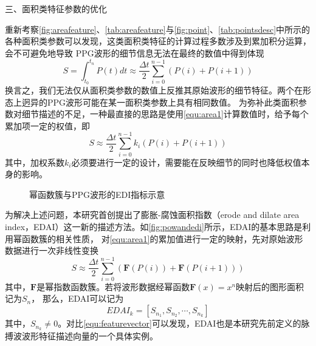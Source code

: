 三、面积类特征参数的优化

重新考察\autoref{fig:areafeature}、\autoref{tab:areafeature}与\autoref{fig:point}、\autoref{tab:pointsdesc}中所示的各种面积类参数可以发现，这类面积类特征的计算过程多数涉及到累加积分运算，会不可避免地导致
PPG波形的细节信息无法在最终的数值中得到体现
\begin{equation}
    \label{equ:area1}
    S = \int_{t_0}^{t_n}P(t)dt \approx \frac{\Delta t}{2} \sum_{i=0}^{n-1}{(P(i)+P(i+1))}
\end{equation}
换言之，我们无法仅从面积类参数的数值上反推其原始波形的细节特征。两个在形态上迥异的PPG波形可能在某一面积类参数上具有相同数值。
为弥补此类面积参数对细节描述的不足，一种最直接的思路是使用\autoref{equ:area1}计算数值时，给予每个累加项一定的权值，即
\begin{equation}
    \label{equ:area2}
    S \approx \frac{\Delta t}{2} \sum_{i=0}^{n-1}{k_{i} (P(i)+P(i+1))}
\end{equation}
其中，加权系数$k_{i}$必须要进行一定的设计，需要能在反映细节的同时也降低权值本身的影响。
\begin{figure}[h]
    \centering
    \quad
    \quad
    \quad
    \caption{\label{fig:powandedi}幂函数簇与PPG波形的EDI指标示意}
\end{figure}

为解决上述问题，本研究首创提出了膨胀-腐蚀面积指数（erode and dilate area index，EDAI）这一新的描述方法。如\autoref{fig:powandedi}所示，EDAI的基本思路是利用幂函数簇的相关性质，
对\autoref{equ:area1}的累加值进行一定的映射，先对原始波形数据进行一次非线性变换
\begin{equation}
    \label{equ:area3}
    S \approx \frac{\Delta t}{2} \sum_{i=0}^{n-1}{(\boldsymbol F (P(i))+\boldsymbol F (P(i+1)))}
\end{equation}
其中，$\boldsymbol F$是幂指数函数簇。若将波形数据经幂函数$\boldsymbol F(x)=x^n$映射后的图形面积记为$S_n$，
那么，EDAI可以记为
\begin{equation}
    \label{equ:edai}
    EDAI_{k}=[S_{n_1},S_{n_2},\cdots,S_{n_k}]
\end{equation}
其中，$S_{n_k} \neq 0$。对比\autoref{equ:featurevector}可以发现，EDAI也是本研究先前定义的脉搏波波形特征描述向量的一个具体实例。

